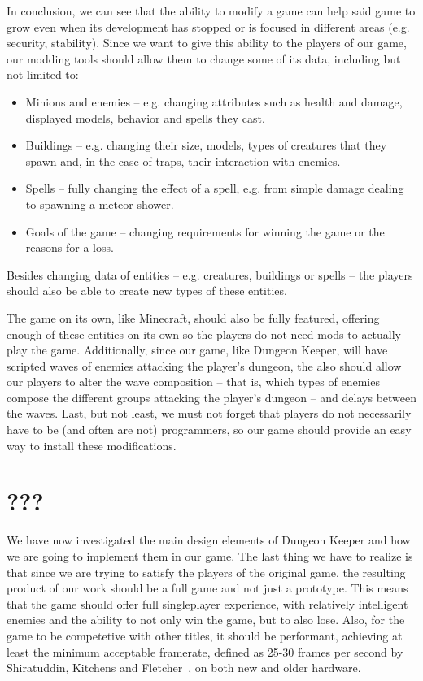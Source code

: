 In conclusion, we can see that the ability to modify a game can help said game to grow even when its development has stopped
or is focused in different areas (e.g. security, stability). Since we want to give this ability to the players of
our game, our modding tools should allow them to change some of its data, including but not limited to:

\begin{itemize}
    \item Minions and enemies -- e.g. changing attributes such as health and damage, displayed models, behavior and spells they
        cast.
    \item Buildings -- e.g. changing their size, models, types of creatures that they spawn and, in the case of traps, their interaction with
        enemies.
    \item Spells -- fully changing the effect of a spell, e.g. from simple damage dealing to spawning a meteor shower.
    \item Goals of the game -- changing requirements for winning the game or the reasons for a loss.
\end{itemize}

Besides changing data of entities -- e.g. creatures, buildings or spells -- the players should also be able to create new types of these
entities.

The game on its own, like Minecraft, should also be fully featured, offering enough of these entities
on its own so the players do not need mods to actually play the game. Additionally, since our game, like Dungeon Keeper,
will have scripted waves of enemies attacking the player's dungeon, the also should allow our players to alter the wave 
composition -- that is, which types of enemies compose the different groups attacking the player's dungeon --  and delays between
the waves. Last, but not least, we must not forget that players do not necessarily have to be (and often are not)
programmers, so our game should provide an easy way to install these modifications.

\section{???}

We have now investigated the main design elements of Dungeon Keeper and how we are going 
to implement them in our game. The last thing we have to realize is that since we are trying to satisfy the players of the original
game, the resulting product of our work should be a full game and not just a prototype. This means that the game should offer full 
singleplayer experience, with relatively intelligent enemies and the ability to not only win the game, but to also lose. 
Also, for the game to be competetive with other titles,
it should be performant, achieving at least the minimum acceptable framerate, defined as 25-30 frames per second by 
Shiratuddin, Kitchens and Fletcher~\cite{AcceptableFPS}, on both new and older hardware.

